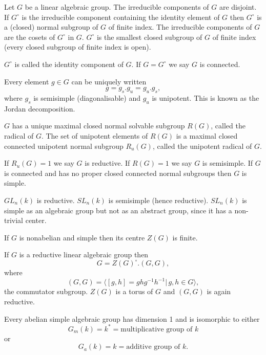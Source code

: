 Let $G$ be a linear algebraic group. The irreducible components of $G$ are disjoint. If $G^\circ$ is the irreducible component containing the identity element of $G$ then $G^\circ$ is a (closed) normal subgroup of $G$ of finite index. The irreducible components of $G$ are the cosets of $G^\circ$ in $G$. $G^\circ$ is the smallest closed subgroup of $G$ of finite index (every closed subgroup of finite index is open).

$G^\circ$ is called the identity component of $G$. If $G = G^\circ$ we say $G$ is connected.

Every element $g\in G$ can be uniquely written
\begin{displaymath}
	g = g_s.g_u = g_u.g_s,
\end{displaymath}
where $g_s$ is semisimple (diagonalisable) and $g_u$ is unipotent. This is known as the Jordan decomposition.

$G$ has a unique maximal closed normal solvable subgroup $R(G)$, called the radical of $G$. The set of unipotent elements of $R(G)$ is a maximal closed connected unipotent normal subgroup $R_u(G)$, called the unipotent radical of $G$.

If $R_u(G) = {1}$ we say $G$ is reductive. If $R(G) = {1}$ we say $G$ is semisimple. If $G$ is connected and has no proper closed connected normal subgroups then $G$ is simple.

\begin{example}
	$GL_n(k)$ is reductive. $SL_n(k)$ is semisimple (hence reductive). $SL_n(k)$ is simple as an algebraic group but not as an abstract group, since it has a non-trivial center.
\end{example}

If $G$ is nonabelian and simple then its centre $Z(G)$ is finite.

If $G$ is a reductive linear algebraic group then
\begin{displaymath}
	G = Z(G)^\circ.(G,G),
\end{displaymath}
where
\begin{displaymath}
	(G,G) = \langle [g, h] = ghg^{-1}h^{-1}|\,g,h\in G\rangle,
\end{displaymath}
the commutator subgroup. $Z(G)$ is a torus of $G$ and $(G, G)$ is again reductive.

Every abelian simple algebraic group has dimension 1 and is isomorphic to either
\begin{displaymath}
	G_m(k) = k^* = \textrm{multiplicative group of }k
\end{displaymath}
or
\begin{displaymath}
	G_a(k) = k = \textrm{additive group of }k.
\end{displaymath}

